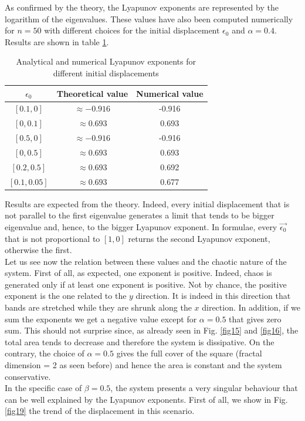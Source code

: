 \documentclass[11pt,titlepage]{article}
\begin{document}
As confirmed by the theory, the Lyapunov exponents are represented by the logarithm of the eigenvalues. These values have also been computed numerically for $n=50$ with different choices for the initial displacement $\epsilon_0$ and $\alpha=0.4$. Results are shown in table \ref{tab8}. \\

\begin{table}[h]
	\centering
	\caption{Analytical and numerical Lyapunov exponents for different initial displacements} \label{tab8}
	\begin{tabular}{ | c | c | c |}
		\hline
		$\epsilon_0$ & Theoretical value & Numerical value \\
		\hline
		$[0.1,0]$ & $\approx -0.916$& -0.916\\
		\hline
		$[0,0.1]$ & $\approx  0.693$& 0.693\\
		\hline
		$[0.5,0]$ & $\approx -0.916$& -0.916\\
		\hline
		$[0,0.5]$ & $\approx  0.693$& 0.693\\
		\hline
		$[0.2,0.5]$ & $\approx  0.693$& 0.692\\
		\hline
		$[0.1,0.05]$ & $\approx  0.693$& 0.677\\
		\hline
	\end{tabular}
\end{table}
Results are expected from the theory. Indeed, every initial displacement that is not parallel to the first eigenvalue generates a limit that tends to be bigger eigenvalue and, hence, to the bigger Lyapunov exponent. In formulae, every $\vec{\epsilon_0}$ that is not proportional to $[1,0]$ returns the second Lyapunov exponent, otherwise the first. \\
Let us see now the relation between these values and the chaotic nature of the system. First of all, as expected, one exponent is positive. Indeed, chaos is generated only if at least one exponent is positive. Not by chance, the positive exponent is the one related to the $y$ direction. It is indeed in this direction that bands are stretched while they are shrunk along the $x$ direction. In addition, if we sum the exponents we get a negative value except for $\alpha=0.5$ that gives zero sum. This should not surprise since, as already seen in Fig. \ref{fig15} and \ref{fig16}, the total area tends to decrease and therefore the system is dissipative. On the contrary, the choice of $\alpha=0.5$ gives the full cover of the square (fractal dimension = 2 as seen before) and hence the area is constant and the system conservative. \\
In the specific case of $\beta=0.5$, the system presents a very singular behaviour that can be well explained by the Lyapunov exponents. First of all, we show in Fig. \ref{fig19} the trend of the displacement in this scenario. \\
\end{document}
